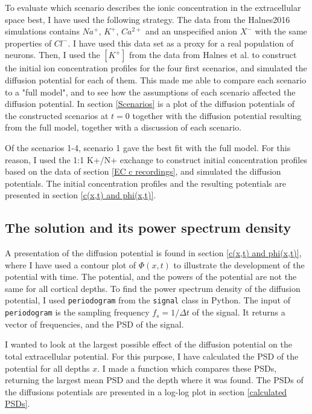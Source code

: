 \documentclass{article}
\begin{document}
To evaluate which scenario describes the ionic concentration in the extracellular space best, I have used the following strategy. 
The data from the Halnes2016 simulations \cite{Halnes2016} contains $Na^+$, $K^+$, $Ca^{2+}$ and an unspecified anion $X^-$ with the same properties of $Cl^-$. I have used this data set as a proxy for a real population of neurons. Then, I used the $[K^+]$ from the data from Halnes et al. to construct the initial ion concentration profiles for the four first scenarios, and simulated the diffusion potential for each of them. This made me able to compare each scenario to a "full model", and to see how the assumptions of each scenario affected the diffusion potential. In section \ref{Scenarios} is a plot of the diffusion potentials of the constructed scenarios at $t=0$ together with the diffusion potential resulting from the full model, together with a discussion of each scenario. 

Of the scenarios 1-4, scenario 1 gave the best fit with the full model. For this reason, I used the 1:1 K+/N+ exchange to construct initial concentration profiles based on the data of section \ref{EC c recordings}, and simulated the diffusion potentials. The  initial concentration profiles and the resulting potentials are presented in section \ref{c(x,t) and phi(x,t)}.
\subsection{The solution and its power spectrum density}\label{PSD of solution}
A presentation of the diffusion potential is found in section \ref{c(x,t) and phi(x,t)}, where I have used a contour plot of $\Phi(x,t)$ to illustrate the development of the potential with time. The potential, and the powers of the potential are not the same for all cortical depths.
To find the power spectrum density of the diffusion potential, I used \texttt{periodogram}  from the \texttt{signal} class in Python. The input of \texttt{periodogram} is the sampling frequency $f_s = 1/\Delta t$ of the signal. It returns a vector of frequencies, and the PSD of the signal.

 I wanted to look at the largest possible effect of the diffusion potential on the total extracellular potential. For this purpose, I have calculated the PSD of the potential for all depths $x$. I made a function which compares these PSDs, returning the largest mean PSD and the depth where it was found. The PSDs of the diffusions potentials are presented in a log-log plot in section \ref{calculated PSDs}. 
\end{document}
